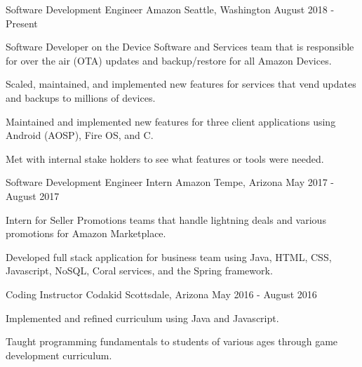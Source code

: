 \documentclass[
    changecolor={96, 52, 177},
]{peter-resume}
\begin{document}
\pagestyle{empty} %

\cventry
  {Software Development Engineer}
  {Amazon}
  {Seattle, Washington}
  {August 2018 - Present}
  {
    \begin{cvitems}
      \item {Software Developer on the Device Software and Services team that is responsible for over the air (OTA) updates and backup/restore for all Amazon Devices.}
      \item {Scaled, maintained, and implemented new features for services that vend updates and backups to millions of devices.}
      \item {Maintained and implemented new features for three client applications using Android (AOSP), Fire OS, and C.}
      \item {Met with internal stake holders to see what features or tools were needed.}
    \end{cvitems}
  }
\cventry
  {Software Development Engineer Intern}
  {Amazon}
  {Tempe, Arizona}
  {May 2017 - August 2017}
  {
    \begin{cvitems}
      \item {Intern for Seller Promotions teams that handle lightning deals and various promotions for Amazon Marketplace.}
      \item {Developed full stack application for business team using Java, HTML, CSS, Javascript, NoSQL, Coral services, and the Spring framework.}
    \end{cvitems}
  }
\cventry
  {Coding Instructor}
  {Codakid}
  {Scottsdale, Arizona}
  {May 2016 - August 2016}
  {
    \begin{cvitems}
      \item {Implemented and refined curriculum using Java and Javascript.}
      \item {Taught programming fundamentals to students of various ages through game development curriculum.}
    \end{cvitems}
  }
\end{document}
